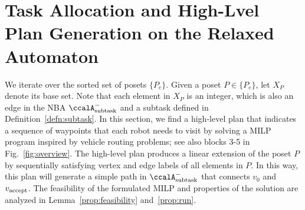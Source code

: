 \documentclass[Afour,sageh,times]{sagej}
\newcommand{\auto}[1]{\ccalA_{\textup{#1}}}
\newcommand{\vertex}[1]{v_{\textup{#1}}}
\begin{document}
\section{Task Allocation and High-Lvel Plan Generation  on  the Relaxed Automaton}\label{sec:solution}
We iterate over the sorted set of posets $\{P_e\}$. Given a poset $P\in \{P_e\}$, let $X_{P}$ denote its base set. Note that each element in $X_P$ is an integer, which is also an edge in the NBA $\auto{subtask}^-$ and a subtask defined in Definition~\ref{defn:subtask}. In this section, we find a high-level plan that indicates a sequence of waypoints that each robot needs to visit by solving a MILP program inspired by vehicle routing problems; see also blocks 3-5 in Fig.~\ref{fig:overview}.  The high-level plan produces a linear extension of the poset $P$ by sequentially satisfying vertex and edge labels of all elements in $P$. In this way,  this plan will generate a simple path in $\auto{subtask}^-$ that connects $v_0$ and $\vertex{accept}$. The feasibility of the formulated MILP and properties of the solution are analyzed in Lemma~\ref{prop:feasibility} and~\ref{prop:run}.
\end{document}
